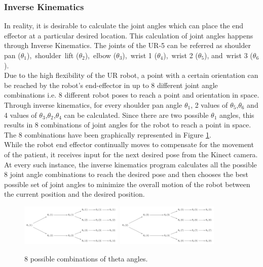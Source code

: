 \documentclass[conference]{IEEEtran}
\begin{document}
\subsubsection{Inverse Kinematics}
In reality, it is desirable to calculate the joint angles which can place the end effector at a particular desired location. This calculation of joint angles happens through Inverse Kinematics. The joints of the UR-5 can be referred as  shoulder pan ($\theta_1$),\, shoulder\, lift ($\theta_2$),\, elbow ($\theta_3$),\, wrist 1 ($\theta_4$),\, wrist 2 ($\theta_5$), and\, wrist 3 ($\theta_6$). \\
Due to the high flexibility of the UR robot, a point with a certain orientation can be reached by the robot's end-effector in up to 8 different joint angle combinations i.e. 8 different robot poses to reach a point and orientation in space. Through inverse kinematics, for every shoulder pan angle $\theta_1$, 2 values of $\theta_5$,$\theta_6$ and 4 values of $\theta_3$,$\theta_2$,$\theta_4$ can be calculated. Since there are two possible $\theta_1$ angles, this results in 8 combinations of joint angles for the robot to reach a point in space. The 8 combinations have been graphically represented in Figure \ref{Figure 1}. \\
While the robot end effector continually moves to compensate for the movement of the patient, it receives input for the next desired pose from the Kinect camera. At every such instance, the inverse kinematics program calculates all the possible 8 joint angle combinations to reach the desired pose and then chooses the best possible set of joint angles to minimize the overall motion of the robot between the current position and the desired position.\\
\begin{figure}[]
	\centering
	\includegraphics[width=0.435\textwidth, trim={0.01cm 0.01cm 0.01cm 0.01cm}, clip]{figures/Angle_Combination1.pdf}
	\includegraphics[width=0.435\textwidth, trim={0.01cm 0.01cm 0.01cm 0.01cm}, clip]{figures/Angle_Combination2.pdf}
	\caption{8 possible combinations of theta angles.}
	\label{Figure 1}
\end{figure}
\end{document}
